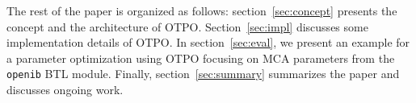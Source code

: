 The rest of the paper is organized as follows: section~\ref{sec:concept}
presents the concept and the architecture of OTPO. 
Section~\ref{sec:impl} discusses some implementation details
of OTPO. In section~\ref{sec:eval}, we present an example for a
parameter optimization using OTPO focusing on MCA parameters from the
{\tt openib} BTL module. Finally, section~\ref{sec:summary} summarizes
the paper and discusses ongoing work.

